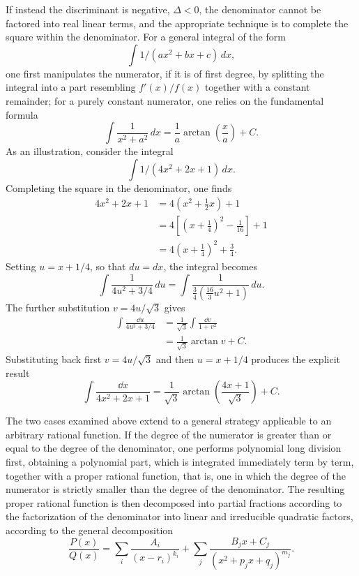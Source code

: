 If instead the discriminant is negative, $\Delta < 0$, the denominator cannot be factored into real linear terms, and the appropriate technique is to complete the square within the denominator. For a general integral of the form \[
\int 1/(ax^2+bx+c) \, dx,
\] one first manipulates the numerator, if it is of first degree, by splitting the integral into a part resembling $f'(x)/f(x)$ together with a constant remainder; for a purely constant numerator, one relies on the fundamental formula
\[
\int \frac{1}{x^2+a^2} \, dx = \frac{1}{a} \arctan\!\left( \frac{x}{a} \right) + C.
\]
As an illustration, consider the integral
\[
\int 1/(4x^2+2x+1) \, dx.
\]
Completing the square in the denominator, one finds
\[
\begin{aligned}
4x^2+2x+1 &= 4\left(x^2 + \frac{1}{2}x\right)+1 \\
&= 4\left[\left(x+\frac{1}{4}\right)^2 - \frac{1}{16}\right]+1 \\
&= 4\left(x+\frac{1}{4}\right)^2 + \frac{3}{4}.
\end{aligned}
\]
Setting $u = x+1/4$, so that $du = dx$, the integral becomes
\[
\int \frac{1}{4u^2 + 3/4} \, du = \int \frac{1}{\tfrac{3}{4}\left( \tfrac{16}{3} u^2 + 1 \right)} \, du.
\]
The further substitution $v=4u/\sqrt{3}$ gives
\[
\begin{aligned}
\int \frac{\dd u}{4u^2+3/4}
&=\frac{1}{\sqrt{3}}\int\frac{\dd v}{1+v^2}\\
&=\frac{1}{\sqrt{3}}\arctan v+C.
\end{aligned}
\]
Substituting back first $v=4u/\sqrt{3}$ and then $u=x+1/4$
produces the explicit result
\[
\boxed{\int\frac{\dd x}{4x^2+2x+1}
=\frac{1}{\sqrt{3}}
\arctan\!\left(\frac{4x+1}{\sqrt{3}}\right)+C.}
\]


The two cases examined above extend to a general strategy applicable to an arbitrary rational function. If the degree of the numerator is greater than or equal to the degree of the denominator, one performs polynomial long division first, obtaining a polynomial part, which is integrated immediately term by term, together with a proper rational function, that is, one in which the degree of the numerator is strictly smaller than the degree of the denominator. The resulting proper rational function is then decomposed into partial fractions according to the factorization of the denominator into linear and irreducible quadratic factors, according to the general decomposition
\[
\frac{P(x)}{Q(x)} = \sum_i \frac{A_i}{(x-r_i)^{k_i}} + \sum_j \frac{B_j x + C_j}{(x^2+p_j x+q_j)^{m_j}}.
\]

